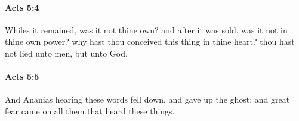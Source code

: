 		\paragraph{Acts 5:4} %
			\label{ACTS-5-4}

			Whiles it remained, was it not thine own?  and after it was sold, was it not in thine own power?  why hast thou conceived this thing in thine heart?  thou hast not lied unto men, but unto God.

			\begin{framed}
			\scriptsize
				\begin{compactdesc}
					\item[SBLG] 
				\end{compactdesc}
			\end{framed}

		\paragraph{Acts 5:5} %
			\label{ACTS-5-5}

			And Ananias hearing these words fell down, and gave up the ghost: and great fear came on all them that heard these things.

